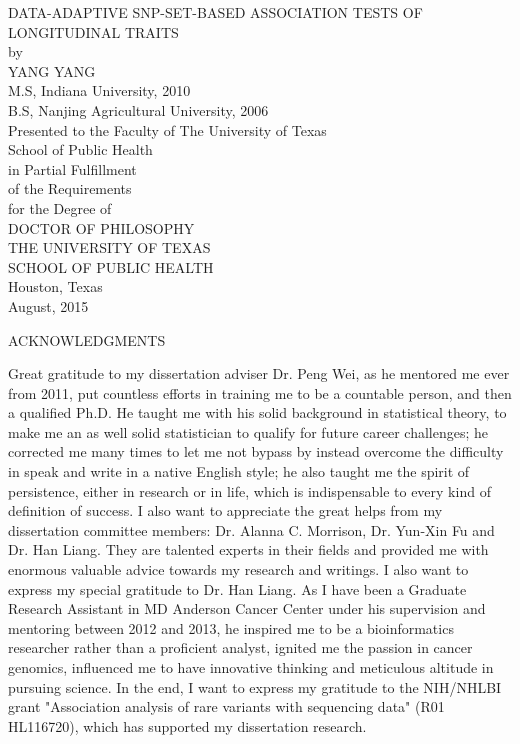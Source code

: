 \documentclass[12pt]{article}
\begin{document}
\newpage
\thispagestyle{empty}
\doublespacing
\begin{center}
{\normalsize DATA-ADAPTIVE SNP-SET-BASED ASSOCIATION TESTS OF LONGITUDINAL TRAITS }\\[3.2cm]

by\\[0.5cm]

YANG YANG\\
M.S, Indiana University, 2010\\
B.S, Nanjing Agricultural University, 2006\\[2cm]

Presented to the Faculty of The University of Texas\\
School of Public Health\\
in Partial Fulfillment\\
of the Requirements\\
for the Degree of\\[1.5cm]
DOCTOR OF PHILOSOPHY\\[1.5cm]
\singlespacing
THE UNIVERSITY OF TEXAS\\
SCHOOL OF PUBLIC HEALTH\\
Houston, Texas\\
August, 2015
\end{center}


\newpage
\thispagestyle{empty}
\doublespacing
\begin{center}
ACKNOWLEDGMENTS
\end{center}
Great gratitude to my dissertation adviser Dr. Peng Wei, as he mentored me ever from 2011, put countless efforts in training me to be a countable person, and then a qualified Ph.D. He taught me with his solid background in statistical theory, to make me an as well solid statistician to qualify for future career challenges; he corrected me many times to let me not bypass by instead overcome the difficulty in speak and write in a native English style; he also taught me the spirit of persistence, either in research or in life, which is indispensable to every kind of definition of success. I also want to appreciate the great helps from my dissertation committee members: Dr. Alanna C. Morrison, Dr. Yun-Xin Fu and Dr. Han Liang. They are talented experts in their fields and provided me with enormous valuable advice towards my research and writings. I also want to express my special gratitude to Dr. Han Liang. As I have been a Graduate Research Assistant in MD Anderson Cancer Center under his supervision and mentoring between 2012 and 2013, he inspired me to be a bioinformatics researcher rather than a proficient analyst, ignited me the passion in cancer genomics, influenced me to have innovative thinking and meticulous altitude in pursuing science. In the end, I want to express my gratitude to the NIH/NHLBI grant "Association analysis of rare variants with sequencing data" (R01 HL116720), which has supported my dissertation research.
\end{document}
